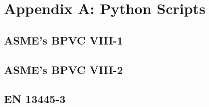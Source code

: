 
\chapter{Appendix A: Python Scripts}
\label{chapt:appendixa}
\nopagebreak
\begin{small}

	\section*{ASME's BPVC VIII-1}
	
	\pagebreak
	
	\section*{ASME's BPVC VIII-2}
	
	\pagebreak
	
	\section*{EN 13445-3}
	

\end{small}